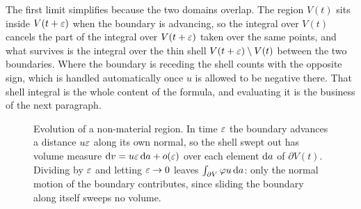 The first limit simplifies because the two domains overlap. The region
$V(t)$ sits inside $V(t+\varepsilon)$ when the boundary is advancing, so the
integral over $V(t)$ cancels the part of the integral over $V(t+\varepsilon)$
taken over the same points, and what survives is the integral over the
thin shell $V(t+\varepsilon)\setminus V(t)$ between the two boundaries. Where the
boundary is receding the shell counts with the opposite sign, which is
handled automatically once $u$ is allowed to be negative there. That
shell integral is the whole content of the formula, and evaluating it is
the business of the next paragraph.

\begin{figure}[htbp]\centering
{}
\caption{Evolution of a non-material region. In time $\varepsilon$ the boundary
advances a distance $u\varepsilon$ along its own normal, so the shell swept out
has volume measure $\mathrm{d} v=u\varepsilon\,\mathrm{d} a+o(\varepsilon)$ over each element $\mathrm{d} a$
of $\partial V(t)$. Dividing by $\varepsilon$ and letting $\varepsilon\to0$ leaves
$\int_{\partial V}\varphi u\,\mathrm{d} a$: only the normal motion of the
boundary contributes, since sliding the boundary along itself sweeps no
volume.}
\label{fig:ch5nonmat}
\end{figure}

